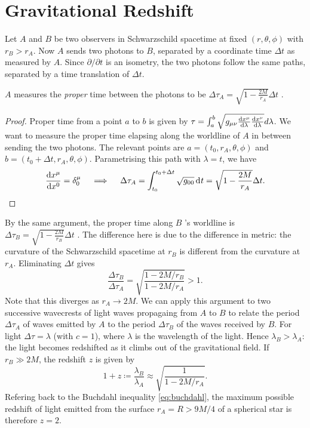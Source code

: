 \section{Gravitational Redshift}%
\label{sec:gravitational_redshift}

Let $A$ and $B$ be two observers in Schwarzschild spacetime at fixed $(r, \theta, \phi)$ with $r_B > r_A$.
Now $A$ sends two photons to $B$, separated by a coordinate time $\Delta t$ as measured by  $A$.
Since  $\partial / \partial t$  is an isometry, the two photons follow the same paths, separated by a time translation of $\Delta t$.
\begin{figure}[tbhp]
  \centering
  \def\svgwidth{0.4\columnwidth}
  
  \caption{}
  \label{fig:l3f1}
\end{figure}
\begin{claim}
  $A$ measures the \emph{proper} time between the photons to be $\Delta \tau_{A} = \sqrt{1 - \frac{2M}{r_A}} \Delta t$ .
\end{claim}
\begin{proof}
  Proper time from a point $a$  to $b$  is given by $\tau = \int_a^b \sqrt{g_{\mu\nu} \dv{x^{\mu}}{\lambda} \dv{x^{\nu}}{\lambda}} d\lambda $.
  We want to measure the proper time elapsing along the worldline of $A$ in between sending the two photons. The relevant points are $a = (t_0, r_A, \theta, \phi)$ and $b = (t_0 + \Delta t, r_A, \theta, \phi)$.
  Parametrising this path with $\lambda = t$, we have
  \begin{equation}
    \dv{x^{\mu}}{x^0} = \delta^{\mu}_0 \quad \implies \quad
    \Delta \tau_A = \int_{t_0}^{t_0 + \Delta t} \sqrt{g_{00}} \dd[]{t} = \sqrt{1 - \frac{2M}{r_A}} \Delta t.
  \end{equation}
\end{proof}
By the same argument, the proper time along $B$ 's worldline is $\Delta \tau_B = \sqrt{1 - \frac{2M}{r_B}} \Delta t$ . The difference here is due to the difference in metric: the curvature of the Schwarzschild spacetime at $r_B$ is different  from the curvature at $r_A$. 
Eliminating $\Delta t$  gives
\begin{equation}
  \frac{\Delta \tau_B}{\Delta \tau_A} = \sqrt{\frac{1 - 2M / r_B}{1 - 2M / r_A}} > 1.
\end{equation}
Note that this diverges as $r_A \to 2M$.
We can apply this argument to two successive wavecrests of light waves propagaing from $A$  to $B$ to relate the period $\Delta \tau_A$ of waves emitted by $A$  to the period $\Delta \tau_B$ of the waves received by  $B$.
For light $\Delta \tau = \lambda$  (with $c = 1$), where $\lambda$  is the wavelength of the light.
Hence $\lambda_B  > \lambda_A$: the light becomes redshifted as it climbs out of the gravitational field.
If $r_B \gg 2M$, the redshift $z$  is given by
\begin{equation}
  1 + z \coloneqq \frac{\lambda_B}{\lambda_A} \approx \sqrt{\frac{1}{1 - 2M / r_A}}.
\end{equation} 
Refering back to the Buchdahl inequality \eqref{eq:buchdahl}, the maximum possible redshift of light emitted from the surface $r_A = R > 9 M / 4$ of a spherical star is therefore $z = 2$.

